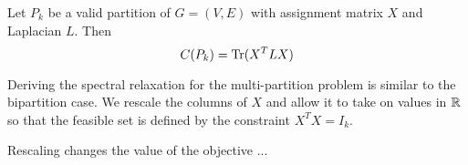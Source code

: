 \begin{prop}
Let $P_k$ be a valid partition of $G = (V,E)$
with assignment matrix $X$ and Laplacian $L$. Then
\[ C(P_k) = \operatorname{Tr}(X^T L X) \]
\end{prop}

Deriving the spectral relaxation for the multi-partition problem is
similar to the bipartition case. We rescale the columns of $X$ and
allow it to take on values in $\mathbb{R}$ so that the feasible set is
defined by the constraint $X^T X = I_k$.

Rescaling changes the value of the objective ...

